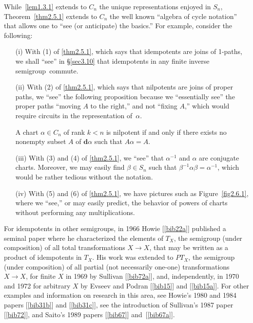 \documentclass{surv-l}
\numberwithin{equation}{section}
\numberwithin{table}{section}
\numberwithin{figure}{section}
\theoremstyle{plain}
\theoremstyle{definition}
\begin{document}
While~\ref{lem1.3.1} extends to $C_{n}$ the unique representations
enjoyed in $S_{n}$, Theorem~\ref{thm2.5.1} extends to $C_{n}$ the
well known ``algebra of cycle notation'' that allows one to ``see (or anticipate) the basics.''
For example, consider the following:
\begin{enumerate}
\item[(i)] With (1) of \ref{thm2.5.1}, which says that idempotents are joins of
1-paths, we shall ``see'' in \S\ref{sec3.10} that idempotents
in any finite inverse semigroup~commute.

\item[(ii)] With (2) of \ref{thm2.5.1}, which says that nilpotents are joins of
proper paths, we ``see'' the following proposition because we
``essentially see'' the proper paths ``moving $A$ to the
right,'' and not ``fixing $A$,'' which would require circuits
in the representation of~$\alpha$.

\item[]A chart $\alpha\in C_{n}$ of rank $k<n$ is nilpotent if and
only if there exists no nonempty subset $A$ of
$\mathbf{d}\alpha$ such that $A\alpha= A$.


\item[(iii)] With (3) and (4) of \ref{thm2.5.1}, we ``see'' that $\alpha^{-1}$ and
$\alpha$ are conjugate charts. Moreover, we may easily find
$\beta\in S_{n}$ such that
$\beta^{-1}\alpha\beta=\alpha^{-1}$, which would be rather
tedious without the notation.

\item[(iv)] With (5) and (6) of \ref{thm2.5.1}, we have pictures such as Figure~\ref{fig2.6.1},
where we ``see,'' or may easily predict, the behavior of
powers of charts without performing any multiplications.
\end{enumerate}

For idempotents in other semigroups, in 1966 Howie
[\ref{bib22a}] published a seminal paper where
he characterized the elements of $T_{X}$, the semigroup (under
composition) of all total transformations $X\rightarrow X$, that
may be written as a product of idempotents in $T_{X}$. His work
was extended to $PT_{X}$, the semigroup (under composition) of all
partial (not necessarily one-one) transformations $X\rightarrow
X$, for finite $X$ in 1969 by Sullivan
[\ref{bib72a}], and, independently, in 1970 and
1972 for arbitrary $X$ by Evseev and
Podran [\ref{bib15}] and
[\ref{bib15a}]. For other examples and
information on research in this area, see Howie's 1980 and 1984
papers [\ref{bib31b}] and [\ref{bib31c}], see the introduction of
Sullivan's 1987 paper
[\ref{bib72}], and Saito's 1989
papers [\ref{bib67}]
and~[\ref{bib67a}].
\end{document}
